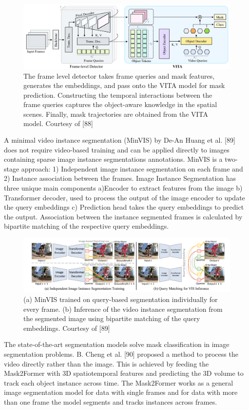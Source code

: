 	\begin{figure}
		\centering
		\includegraphics[width=13cm]{images/VITA.png}
		\caption{The frame level detector takes frame queries and mask features, generates the embeddings, and pass onto the VITA model for mask prediction. Constructing the temporal interactions between the frame queries captures the object-aware knowledge in the spatial scenes. Finally, mask trajectories are obtained from the VITA model. Courtesy of [88]}
		\label{fig:vita}
	\end{figure}
	A minimal video instance segmentation (MinVIS) by De-An Huang et al. [89] does not require video-based training and can be applied directly to images containing sparse image instance segmentations annotations. MinVIS is a two-stage approach: 1) Independent image instance segmentation on each frame and 2) Instance association between the frames. Image Instance Segmentation has three unique main components a)Encoder to extract features from the image b) Transformer decoder, used to process the output of the image encoder to update the query embeddings c) Prediction head takes the query embeddings to predict the output. Association between the instance segmented frames is calculated by bipartite matching of the respective query embeddings.   
	
	\begin{figure}
		\centering
		\includegraphics[width=13cm]{images/minVIS.png}
		\caption{(a) MinVIS trained on query-based segmentation individually for every frame. (b) Inference of the video instance segmentation from the segmented image using bipartite matching of the query embeddings. Courtesy of [89] }
		\label{fig:minVIS}
	\end{figure}
	The state-of-the-art segmentation models solve mask classification in image segmentation problems. B. Cheng et al. [90] proposed a method to process the video directly rather than the image. This is achieved by feeding the Mask2Former with 3D spatiotemporal features and predicting the 3D volume to track each object instance across time. The Mask2Former works as a general image segmentation model for data with single frames and for data with more than one frame the model segments and tracks instances across frames. 

